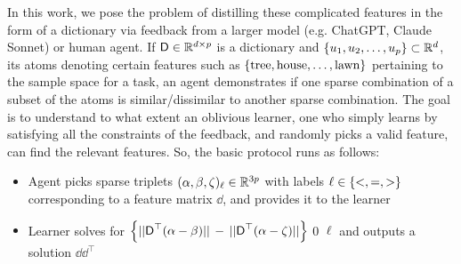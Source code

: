 In this work, we pose the problem of distilling these complicated features in the form of a dictionary via feedback from a larger model (e.g. ChatGPT, Claude Sonnet) or human agent. If $\boldsymbol{\textsf{D}} \in \mathbb{R}^{d \times p}$ is a dictionary and $\left\{u_1,u_2,\ldots,u_p\right\} \subset \mathbb{R}^d$, its atoms denoting certain features such as $\left\{\text{tree}, \text{house}, \ldots, \text{lawn}\right\}$ pertaining to the sample space for a task, an agent demonstrates if one sparse combination of a subset of the atoms is similar/dissimilar to another sparse combination. The goal is to understand to what extent an oblivious learner, one who simply learns by satisfying all the constraints of the feedback, and randomly picks a valid feature, can find the relevant features. So, the basic protocol runs as follows:
\begin{itemize}
    \item Agent picks sparse triplets ${(\alpha, \beta, \zeta)_{\ell} \in \mathbb{R}^{3p}}$ with labels $\ell \in \left\{<, =, >\right\}$ corresponding to a feature matrix $\dd$, and provides it to the learner
    \item Learner solves for $\left\{||\boldsymbol{\textsf{D}}^\top (\alpha - \beta)|| \, - \, ||\boldsymbol{\textsf{D}}^\top (\alpha - \zeta)||\right\}$  0  $\ell$ and outputs a solution $\dd\dd^\top$
\end{itemize}

